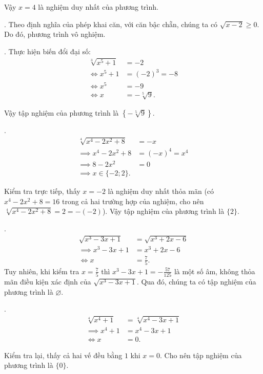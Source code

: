 Vậy $x = 4$ là nghiệm duy nhất của phương trình.

. Theo định nghĩa của phép khai căn, với căn bậc chẵn, chúng ta có $\sqrt{x - 2} \geq 0$. Do đó, phương trình vô nghiệm.

. Thực hiện biến đổi đại số:
\begin{align*}
   \sqrt[3]{x^5 + 1} &= -2 \\
   \iff x^5 + 1 &= (-2)^3 = -8 \\
   \iff x^5 &= -9 \\
   \iff x &= -\sqrt[5]{9}.
\end{align*}

Vậy tập nghiệm của phương trình là $\left\{-\sqrt[5]{9}\right\}$.

.
\begin{align*}
   \sqrt[4]{x^4-2x^2+8} &= -x \\
   \implies x^4 - 2x^2 + 8 &= (-x)^4 = x^4 \\
   \implies 8 - 2x^2 &= 0 \\
   \implies x \in \{-2; 2\}.
\end{align*}

Kiểm tra trực tiếp, thấy $x = -2$ là nghiệm duy nhất thỏa mãn (có $x^4-2x^2+8 = 16$ trong cả hai trường hợp của nghiệm, cho nên $\sqrt[4]{x^4-2x^2+8} = 2 = -(-2)$). Vậy tập nghiệm của phương trình là $\{2\}$.

.
\begin{align*}
   \sqrt{x^3-3x+1} &= \sqrt{x^3+2x-6} \\
   \implies x^3-3x+1 &= x^3 + 2x - 6 \\
   \iff x &= \frac{7}{5}.
\end{align*}
Tuy nhiên, khi kiểm tra $x = \frac{7}{5}$ thì $x^3 - 3x + 1 = -\frac{57}{125}$ là một số âm, không thỏa mãn điều kiện xác định của $\sqrt{x^3-3x+1}$. Qua đó, chúng ta có tập nghiệm của phương trình là $\varnothing$.

.
\begin{align*}
   \sqrt[4]{x^4 + 1} &= \sqrt[4]{x^4 - 3x + 1} \\
   \implies x^4 + 1 &= x^4 - 3x + 1 \\
   \iff x &= 0. 
\end{align*}

Kiểm tra lại, thấy cả hai vế đều bằng $1$ khi $x = 0$. Cho nên tập nghiệm của phương trình là $\{0\}$.

